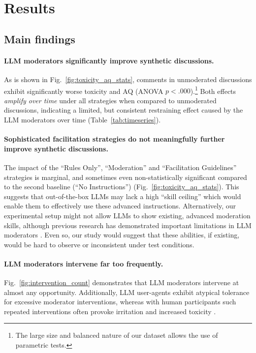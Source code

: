 %

\section{Results}
\label{sec:results}


\subsection{Main findings}

\paragraph{\ac{LLM} moderators significantly improve synthetic discussions.} As is shown in Fig.~\ref{fig:toxicity_aq_stats}, comments in unmoderated discussions exhibit significantly worse toxicity and \ac{AQ} (ANOVA $p<.000$).\footnote{The large size and balanced nature of our dataset allows the use of parametric tests.} Both effects \emph{amplify over time} under all strategies when compared to unmoderated discussions, indicating a limited, but consistent restraining effect caused by the \ac{LLM} moderators over time (Table~\ref{tab:timeseries}).

\paragraph{Sophisticated facilitation strategies do not meaningfully further improve synthetic discussions.} The impact of the ``Rules Only'', ``Moderation'' and ``Facilitation Guidelines'' strategies is marginal, and sometimes even non-statistically significant compared to the second baseline (``No Instructions'') (Fig.~\ref{fig:toxicity_aq_stats}). This suggests that out-of-the-box \acp{LLM} may lack a high “skill ceiling” which would enable them to effectively use these advanced instructions. Alternatively, our experimental setup might not allow \acp{LLM} to show existing, advanced moderation skills, although previous research has demonstrated important limitations in \ac{LLM} moderators \cite{cho-etal-2024-language}. Even so, our study would suggest that these abilities, if existing, would be hard to observe or inconsistent under test conditions.

\paragraph{\ac{LLM} moderators intervene far too frequently.} Fig.~\ref{fig:intervention_count} demonstrates that \ac{LLM} moderators intervene at almost any opportunity. Additionally, \ac{LLM} user-agents exhibit atypical tolerance for excessive moderator interventions, whereas with human participants such repeated interventions often provoke irritation and increased toxicity \cite{schaffner_community_guidelines, make_reddit_great, proactive_moderation, cresci_pesonalized_interventions}.

